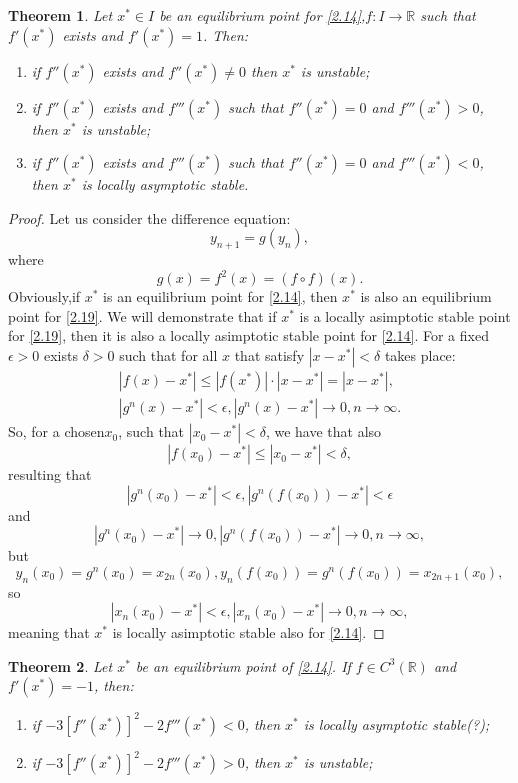 \documentclass[a4paper,11pt]{report}
\newtheorem{theorem}{Theorem}[subsection]
\newcommand{\R}{\mathbb{R}}
\newcommand{\xstar}{x^{*}}
\begin{document}
\begin{theorem}
\label{2.3.2.4.}
 Let $\xstar\in I$ be an equilibrium point for \eqref{2.14},$f:I\rightarrow\R$ such that $f'(\xstar)$ exists and $f'(\xstar)=1$. Then:
 \begin{enumerate}
  \item if $f''(\xstar)$ exists and $f''(\xstar)\neq 0$ then $\xstar$ is unstable;
  \item if $f''(\xstar)$ exists and $f'''(\xstar)$ such that $f''(\xstar)=0$ and $f'''(\xstar)>0$, then $\xstar$ is unstable;
  \item if $f''(\xstar)$ exists and $f'''(\xstar)$ such that $f''(\xstar)=0$ and $f'''(\xstar)<0$, then $\xstar$ is locally asymptotic stable. 
 \end{enumerate}

\end{theorem}
\begin{proof}
 Let us consider the difference equation:
 \begin{equation}\label{2.19}
  y_{n+1}=g(y_{n}),
 \end{equation}
where 
$$g(x)=f^{2}(x)=(f\circ f)(x).$$
Obviously,if $\xstar$ is an equilibrium point for \eqref{2.14}, then $\xstar$ is also an equilibrium point for \eqref{2.19}. We will demonstrate that if $\xstar$ is a locally asimptotic stable point for \eqref{2.19}, then it is also a locally asimptotic stable point for \eqref{2.14}. For a fixed $\epsilon>0$ exists $\delta>0$ such that for all $x$ that satisfy $|x-\xstar|<\delta$ takes place:
\begin{align*}
 |f(x)-\xstar|\leq|f(\xstar)|\cdot |x-\xstar|=|x-\xstar|,\\
 |g^{n}(x)-\xstar|<\epsilon,|g^{n}(x)-\xstar|\rightarrow 0, n\rightarrow \infty.
\end{align*}
So, for a chosen$x_{0}$, such that $|x_{0}-\xstar|<\delta$, we have that also
$$|f(x_{0})-\xstar|\leq|x_{0}-\xstar|<\delta,$$
resulting that 
$$|g^{n}(x_{0})-\xstar|<\epsilon, |g^{n}(f(x_{0}))-\xstar|<\epsilon$$
and
$$|g^{n}(x_{0})-\xstar|\rightarrow 0, |g^{n}(f(x_{0}))-\xstar|\rightarrow 0, n\rightarrow \infty,$$
but
$$y_{n}(x_{0})=g^{n}(x_{0})=x_{2n}(x_{0}), y_{n}(f(x_{0}))=g^{n}(f(x_{0}))=x_{2n+1}(x_{0}),$$
so
$$|x_{n}(x_{0})-\xstar|<\epsilon, |x_{n}(x_{0})-\xstar|\rightarrow 0, n\rightarrow \infty,$$
meaning that $\xstar$ is locally asimptotic stable also for \eqref{2.14}.
\end{proof}

\begin{theorem}
\label{2.3.2.5.}
 Let $\xstar$ be an equilibrium point of \eqref{2.14}. If $f\in C^{3}(\R)$ and $f'(\xstar)=-1$, then:
 \begin{enumerate}
  \item if $-3[f''(\xstar)]^{2}-2f'''(\xstar)<0$, then $\xstar$ is locally asymptotic stable(?);
  \item if $-3[f''(\xstar)]^{2}-2f'''(\xstar)>0$, then $\xstar$ is unstable;
 \end{enumerate}
\end{theorem}
\end{document}
